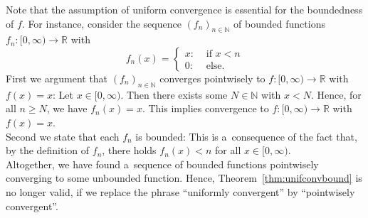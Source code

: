\begin{Remark}{}
  Note that the assumption of uniform convergence is essential for the boundedness of $f$. For instance, consider the sequence $(f_n)_{n\in\mathbb{N}}$ of bounded functions $f_n:[0,\infty)\to\mathbb{R}$ with
\[f_n(x)=\begin{cases}x:&\text{ if }x<n\\0:&\text{ else.}\end{cases}\]
  First we argument that $(f_n)_{n\in\mathbb{N}}$ converges pointwisely to $f:[0,\infty)\rightarrow \mathbb{R}$ with $f(x)=x$:
  Let $x \in[0,\infty)$. Then there exists some $N\in\mathbb{N}$ with $x<N$. Hence, for all $n\geq N$, we have $f_n(x)=x$. This implies convergence to $f:[0,\infty)\to\mathbb{R}$ with $f(x)=x$.\\
Second we state that each $f_n$ is bounded: This is a~consequence of the fact that, by the definition of $f_n$, there holds $f_n(x)<n$ for all $x\in[0,\infty)$.\\
Altogether, we have found a~sequence of bounded functions pointwisely converging to some unbounded function. Hence, Theorem~\ref{thm:unifconvbound} is no longer valid, if we replace the phrase ``uniformly convergent''
by ``pointwisely convergent''.
\end{Remark}

